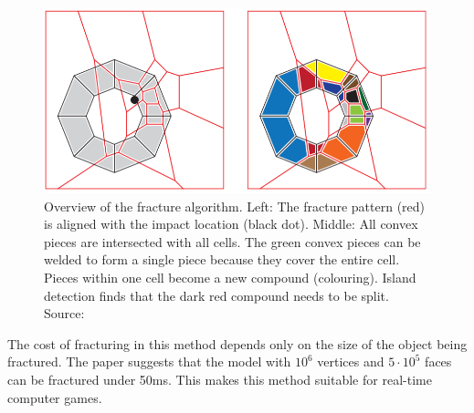 \begin{figure}
\centering
        \includegraphics[width=\textwidth]{img/vacdAlgorithm}
        \caption{Overview of the fracture algorithm. Left: The fracture pattern (red) is aligned with the impact location (black dot). Middle: All
convex pieces are intersected with all cells. The green convex pieces can be welded to form a single piece because they cover the entire
cell. Pieces within one cell become a new compound (colouring). Island detection finds that the dark red compound needs to be split. Source: \citet{nvidia}}
        \label{fig:vacdalg}
\end{figure}

The cost of fracturing in this method depends only on the size  of the object being fractured. The paper suggests that the model with $10^6$ vertices and $5\cdot10^5$ faces can be fractured under 50ms. This makes this method suitable for real-time computer games.

